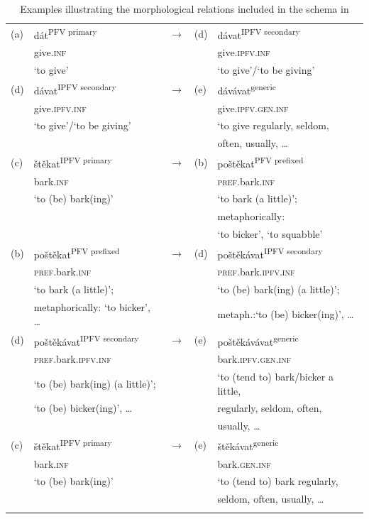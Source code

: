 \documentclass[output=paper,colorlinks,citecolor=brown]{langscibook}
\begin{document}
\begin{table}
\caption{Examples illustrating the morphological relations included in the schema in }
\label{filip:tab:examples}
\begin{tabularx}{\textwidth}{l@{~~}X@{}cl@{~~}X}
\lsptoprule
    (a)&dát\textsuperscript{PFV primary}&$\rightarrow$&(d)&dávat\textsuperscript{IPFV secondary}\\
    &give.\textsc{inf}&&&give.\textsc{ipfv.inf}\\
    &`to give'&&&`to give'/`to be giving'\\[2ex]
    (d)&dávat\textsuperscript{IPFV secondary}&$\rightarrow$&(e)&dávávat\textsuperscript{generic}\\
    &give.\textsc{ipfv.inf}&&&give.\textsc{ipfv}.\textsc{gen}.\textsc{inf}\\
    &`to give'/`to be giving'&&&`to give regularly, seldom,\\
    &&&&often, usually, \dots\\[2ex]
    (c)&štěkat\textsuperscript{IPFV primary}&$\rightarrow$&(b)&poštěkat\textsuperscript{PFV prefixed}\\
    &bark.\textsc{inf}&&&\textsc{pref}.bark.\textsc{inf}\\
    &`to (be) bark(ing)'&&&`to bark (a little)';\\
    &&&&metaphorically:\\
    &&&&`to bicker', `to squabble'\\[2ex]
    (b)&poštěkat\textsuperscript{PFV prefixed}&$\rightarrow$&(d)&poštěkávat\textsuperscript{IPFV secondary}\\
    &\textsc{pref}.bark.\textsc{inf}&&&\textsc{pref}.bark.\textsc{ipfv}.\textsc{inf}\\
    &`to bark (a little)';&&&`to (be) bark(ing) (a little)';\\
    &metaphorically: `to bicker', \dots&&&metaph.:`to (be) bicker(ing)', \dots\\[2ex]
    (d)&poštěkávat\textsuperscript{IPFV secondary}&$\rightarrow$&(e)&poštěkávávat\textsuperscript{generic}\\
    &\textsc{pref}.bark.\textsc{ipfv}.\textsc{inf}&&&bark.\textsc{ipfv}.\textsc{gen}.\textsc{inf}\\
    &`to (be) bark(ing) (a little)';&&&`to (tend to) bark/bicker a little,\\
    &`to (be) bicker(ing)', \dots&&&regularly, seldom, often,\\
    &&&&usually, \dots\\[2ex]
    (c)&štěkat\textsuperscript{IPFV primary}&$\rightarrow$&(e)&štěkávat\textsuperscript{generic}\\
    &bark.\textsc{inf}&&&bark.\textsc{gen}.\textsc{inf}\\
    &`to (be) bark(ing)'&&&`to (tend to) bark regularly,\\
    &&&&seldom, often, usually, \dots\\
    \lspbottomrule
\end{tabularx}
\end{table}
\end{document}
